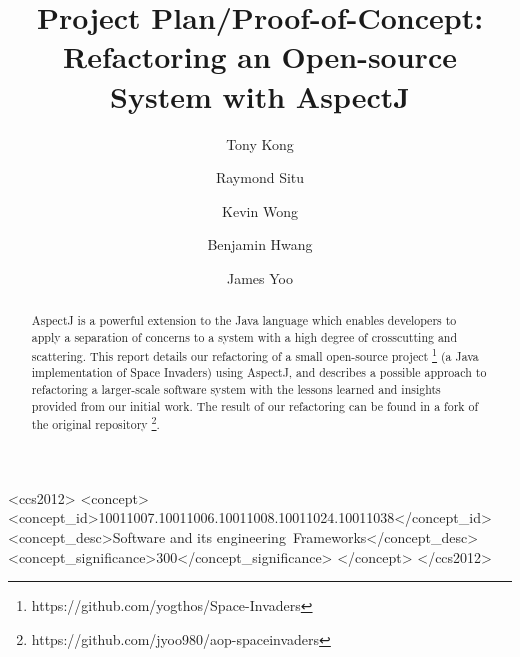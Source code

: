 \documentclass[sigconf]{acmart}
\begin{document}
\title{Project Plan/Proof-of-Concept:\\ Refactoring an Open-source System with AspectJ}

\author{Tony Kong}

\author{Raymond Situ}

\author{Kevin Wong}

\author{Benjamin Hwang}

\author{James Yoo}

\begin{abstract}
AspectJ is a powerful extension to the Java language which enables developers to apply a separation of concerns to a system with a high degree of crosscutting and scattering. This report details our refactoring of a small open-source project \footnote{https://github.com/yogthos/Space-Invaders} (a Java implementation of Space Invaders) using AspectJ, and describes a possible approach to refactoring a larger-scale software system with the lessons learned and insights provided from our initial work. The result of our refactoring can be found in a fork of the original repository \footnote{https://github.com/jyoo980/aop-spaceinvaders}.
\end{abstract}

\begin{CCSXML}
<ccs2012>
<concept>
<concept_id>10011007.10011006.10011008.10011024.10011038</concept_id>
<concept_desc>Software and its engineering~Frameworks</concept_desc>
<concept_significance>300</concept_significance>
</concept>
</ccs2012>
\end{CCSXML}

\maketitle
\end{document}
